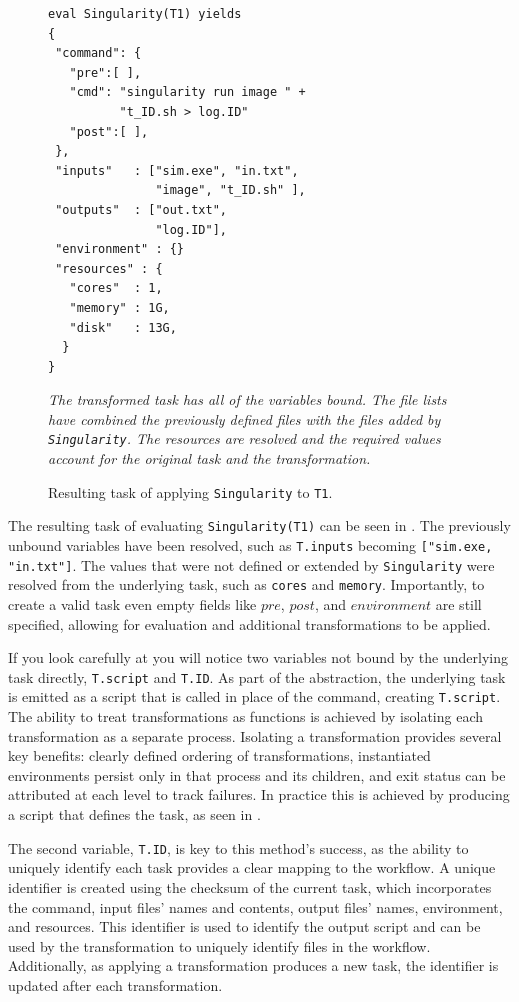 \documentclass[conference]{IEEEtran}
\begin{document}
\begin{figure}[t]
\begin{framed}
\begin{verbatim}
eval Singularity(T1) yields
{
 "command": {
   "pre":[ ],
   "cmd": "singularity run image " +
          "t_ID.sh > log.ID"
   "post":[ ],
 },
 "inputs"   : ["sim.exe", "in.txt", 
               "image", "t_ID.sh" ],
 "outputs"  : ["out.txt", 
               "log.ID"],
 "environment" : {}
 "resources" : {
   "cores"  : 1, 
   "memory" : 1G, 
   "disk"   : 13G,
  }
}
\end{verbatim}
\end{framed}
\caption{Resulting task of applying {\tt Singularity} to {\tt T1}.}
\small
\emph{The transformed task has all of the variables bound.
The file lists have combined the previously defined files
with the files added by {\tt Singularity}.
The resources are resolved and the required values account
for the original task and the transformation.}
\label{sing-task}
\end{figure}


The resulting task of evaluating 
\verb$Singularity(T1)$
can be seen in .
The previously unbound variables have
been resolved, such as {\tt T.inputs}
becoming {\tt ["sim.exe, "in.txt"]}.
The values that were not defined or
extended by \verb$Singularity$ were
resolved from the underlying task,
such as {\tt cores} and {\tt memory}.
Importantly, to create a valid task
even empty fields like $pre$, $post$,
and $environment$ are still specified, 
allowing for evaluation and additional
transformations to be applied.

If you look carefully at 
you will notice two variables not
bound by the underlying task
directly, {\tt T.script} and {\tt T.ID}.
As part of the abstraction, the 
underlying task is emitted as a script
that is called in place of the command,
creating {\tt T.script}.
The ability to treat transformations as functions 
is achieved by isolating 
each transformation as a separate process.
Isolating a transformation provides 
several key benefits:
clearly defined ordering of transformations,
instantiated environments persist only 
in that process and its children,
and exit status can be attributed 
at each level to track failures.
In practice this is achieved by 
producing a script that
defines the task, as seen in .

The second variable, {\tt T.ID},
is key to this method's success, as 
the ability to uniquely identify
each task provides a clear
mapping to the workflow.
A unique identifier is created
using the checksum of the
current task, which incorporates the
command, input files' names and contents,
output files' names, environment, and
resources. 
This identifier is used to identify the output
script and can be used by the
transformation to uniquely identify 
files in the workflow.
Additionally, as applying a transformation
produces a new task, the identifier 
is updated after each transformation.
\end{document}
